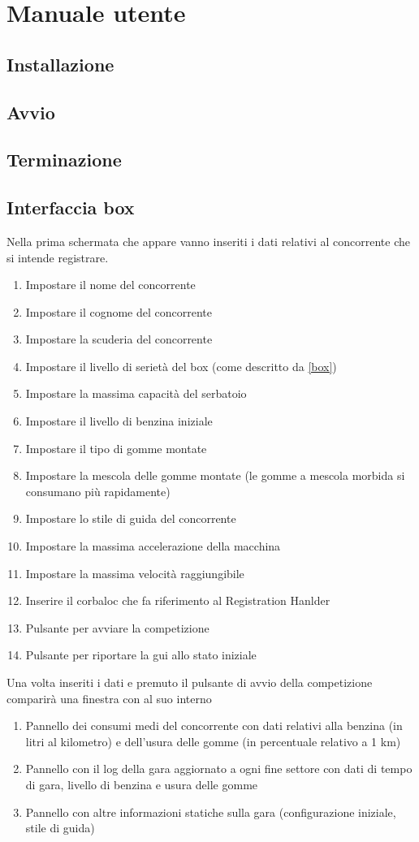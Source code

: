 \section{Manuale utente}
\subsection{Installazione}
\subsection{Avvio}
\subsection{Terminazione}
\subsection{Interfaccia box}
Nella prima schermata che appare vanno inseriti i dati relativi al concorrente che si intende registrare.
\begin{enumerate}
\item Impostare il nome del concorrente
\item Impostare il cognome del concorrente
\item Impostare la scuderia del concorrente
\item Impostare il livello di seriet\`{a} del box (come descritto da \ref{box})
\item Impostare la massima capacit\`{a} del serbatoio
\item Impostare il livello di benzina iniziale
\item Impostare il tipo di gomme montate
\item Impostare la mescola delle gomme montate (le gomme a mescola morbida si consumano pi\`{u} rapidamente)
\item Impostare lo stile di guida del concorrente 
\item Impostare la massima accelerazione della macchina
\item Impostare la massima velocit\`{a} raggiungibile
\item Inserire il corbaloc che fa riferimento al Registration Hanlder
\item Pulsante per avviare la competizione
\item Pulsante per riportare la gui allo stato iniziale
\end{enumerate}
Una volta inseriti i dati e premuto il pulsante di avvio della competizione comparir\`{a} una finestra con al suo interno 
\begin{enumerate}
\item Pannello dei consumi medi del concorrente con dati relativi alla benzina (in litri al kilometro) e dell'usura delle gomme (in percentuale relativo a 1 km)
\item Pannello con il log della gara aggiornato a ogni fine settore con dati di tempo di gara, livello di benzina e usura delle gomme
\item Pannello con altre informazioni statiche sulla gara (configurazione iniziale, stile di guida)
\end{enumerate}
